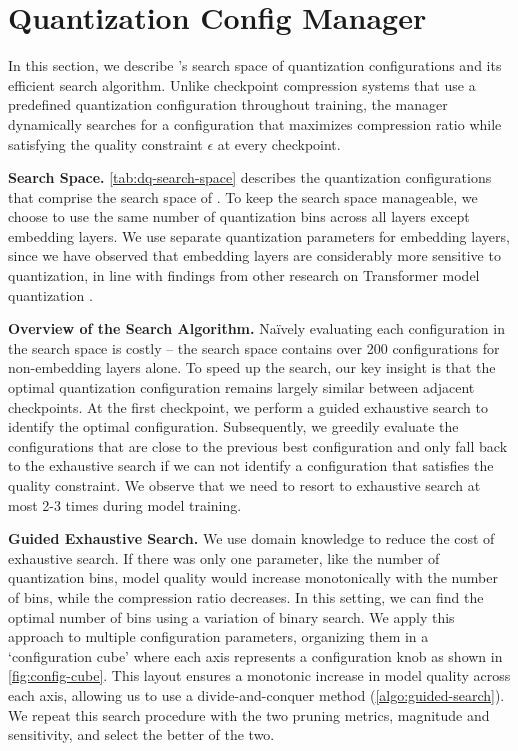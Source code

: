\section{Quantization Config Manager}
\label{sec:search}

In this section, we describe \qcm's search space of quantization configurations and its efficient search algorithm. Unlike checkpoint compression systems that use a predefined quantization configuration throughout training, the manager dynamically searches for a configuration that maximizes compression ratio while satisfying the quality constraint $\epsilon$ at every checkpoint.







\noindent\textbf{Search Space.} \autoref{tab:dq-search-space} describes the quantization configurations that comprise the search space of \qcm. To keep the search space manageable, we choose to use the same number of quantization bins across all layers except embedding layers. We use separate quantization parameters for embedding layers, since we have observed that embedding layers are considerably more sensitive to quantization, in line with findings from other research on Transformer model quantization \cite{gobo, Qbert}.







\noindent\textbf{Overview of the Search Algorithm.} Na\"ively evaluating each configuration in the search space is costly -- the search space contains over 200 configurations for non-embedding layers alone. To speed up the search, our key insight is that the optimal quantization configuration remains largely similar between adjacent checkpoints. At the first checkpoint, we perform a guided exhaustive search to identify the optimal configuration. Subsequently, we greedily evaluate the configurations that are close to the previous best configuration and only fall back to the exhaustive search if we can not identify a configuration that satisfies the quality constraint.  We observe that we need to resort to exhaustive search at most 2-3 times during model training. 





\noindent\textbf{Guided Exhaustive Search.} We use domain knowledge to reduce the cost of exhaustive search. If there was only one parameter, like the number of quantization bins, model quality would increase monotonically with the number of bins, while the compression ratio decreases. In this setting, we can find the optimal number of bins using a variation of binary search. We apply this approach to multiple configuration parameters, organizing them in a `configuration cube' where each axis represents a configuration knob as shown in \cref{fig:config-cube}. This layout ensures a monotonic increase in model quality across each axis, allowing us to use a divide-and-conquer method (\cref{algo:guided-search}). We repeat this search procedure with the two pruning metrics, magnitude and sensitivity, and select the better of the two.


